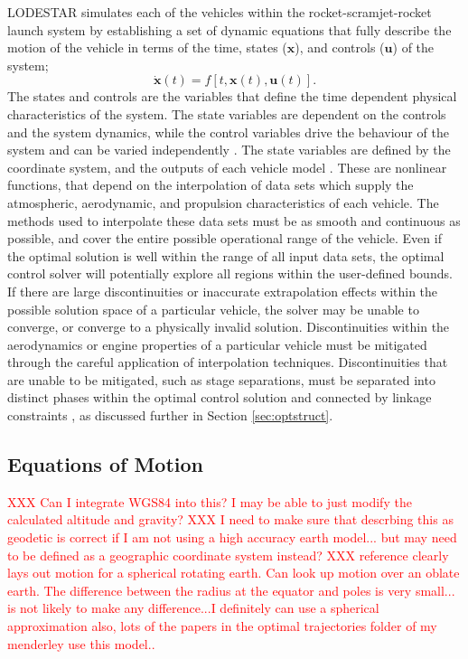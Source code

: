 LODESTAR simulates each of the vehicles within the rocket-scramjet-rocket launch system by establishing a set of dynamic equations that fully describe the motion of the vehicle in terms of the time, states ($\mathbf{x}$), and controls ($\mathbf{u}$) of the system;
\begin{equation}\label{eq:states}
\dot{\textbf{x}}(t) = f[t,\textbf{x}(t),\textbf{u}(t)].
\end{equation}
 The states and controls are the variables that define the time dependent physical characteristics of the system. The state variables are dependent on the controls and the system dynamics, while the control variables drive the behaviour of the system and can be varied independently \cite{Stryk1992}.  
The state variables are defined by the coordinate system, and the outputs of each vehicle model \cite{Rao2009}. These are nonlinear functions, that depend on the interpolation of data sets which supply the atmospheric, aerodynamic, and propulsion characteristics of each vehicle. 
The methods used to interpolate these data sets must be as smooth and continuous as possible, and cover the entire possible operational range of the vehicle. 
Even if the optimal solution is well within the range of all input data sets, the optimal control solver will potentially explore all regions within the user-defined bounds. 
If there are large discontinuities or inaccurate extrapolation effects within the possible solution space of a particular vehicle, the solver may be unable to converge, or converge to a physically invalid solution. 
Discontinuities within the aerodynamics or engine properties of a particular vehicle must be mitigated through the careful application of interpolation techniques. Discontinuities that are unable to be mitigated, such as stage separations, must be separated into distinct phases within the optimal control solution and connected by linkage constraints \cite{Betts1998}, as discussed further in Section \ref{sec:optstruct}. 

\subsection{Equations of Motion}
\textcolor{red}{XXX Can I integrate WGS84 into this? I may be able to just modify the calculated altitude and gravity?}
\textcolor{red}{XXX I need to make sure that descrbing this as geodetic is correct if I am not using a high accuracy earth model... but may need to be defined as a geographic coordinate system instead?}
\textcolor{red}{XXX reference clearly lays out motion for a spherical rotating earth. Can look up motion over an oblate earth. %
	}
\textcolor{red}{The difference between the radius at the equator and poles is very small... is not likely to make any difference...I definitely can use a spherical approximation}
\textcolor{red}{also, lots of the papers in the optimal trajectories folder of my menderley use this model..}

